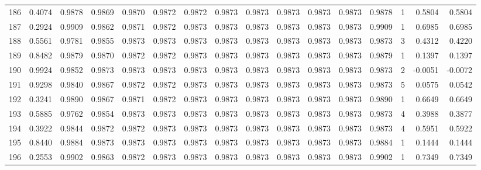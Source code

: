 \begin{tabular}{lrrrrrrrrrrrrrrr}
186 &      0.4074 &  0.9878 &  0.9869 &  0.9870 &  0.9872 &  0.9872 &  0.9873 &  0.9873 &  0.9873 &  0.9873 &   0.9873 &     0.9878 &      1 &                    0.5804 &                     0.5804 \\
187 &      0.2924 &  0.9909 &  0.9862 &  0.9871 &  0.9872 &  0.9873 &  0.9873 &  0.9873 &  0.9873 &  0.9873 &   0.9873 &     0.9909 &      1 &                    0.6985 &                     0.6985 \\
188 &      0.5561 &  0.9781 &  0.9855 &  0.9873 &  0.9873 &  0.9873 &  0.9873 &  0.9873 &  0.9873 &  0.9873 &   0.9873 &     0.9873 &      3 &                    0.4312 &                     0.4220 \\
189 &      0.8482 &  0.9879 &  0.9870 &  0.9872 &  0.9872 &  0.9873 &  0.9873 &  0.9873 &  0.9873 &  0.9873 &   0.9873 &     0.9879 &      1 &                    0.1397 &                     0.1397 \\
190 &      0.9924 &  0.9852 &  0.9873 &  0.9873 &  0.9873 &  0.9873 &  0.9873 &  0.9873 &  0.9873 &  0.9873 &   0.9873 &     0.9873 &      2 &                   -0.0051 &                    -0.0072 \\
191 &      0.9298 &  0.9840 &  0.9867 &  0.9872 &  0.9872 &  0.9873 &  0.9873 &  0.9873 &  0.9873 &  0.9873 &   0.9873 &     0.9873 &      5 &                    0.0575 &                     0.0542 \\
192 &      0.3241 &  0.9890 &  0.9867 &  0.9871 &  0.9872 &  0.9873 &  0.9873 &  0.9873 &  0.9873 &  0.9873 &   0.9873 &     0.9890 &      1 &                    0.6649 &                     0.6649 \\
193 &      0.5885 &  0.9762 &  0.9854 &  0.9873 &  0.9873 &  0.9873 &  0.9873 &  0.9873 &  0.9873 &  0.9873 &   0.9873 &     0.9873 &      4 &                    0.3988 &                     0.3877 \\
194 &      0.3922 &  0.9844 &  0.9872 &  0.9872 &  0.9873 &  0.9873 &  0.9873 &  0.9873 &  0.9873 &  0.9873 &   0.9873 &     0.9873 &      4 &                    0.5951 &                     0.5922 \\
195 &      0.8440 &  0.9884 &  0.9873 &  0.9873 &  0.9873 &  0.9873 &  0.9873 &  0.9873 &  0.9873 &  0.9873 &   0.9873 &     0.9884 &      1 &                    0.1444 &                     0.1444 \\
196 &      0.2553 &  0.9902 &  0.9863 &  0.9872 &  0.9873 &  0.9873 &  0.9873 &  0.9873 &  0.9873 &  0.9873 &   0.9873 &     0.9902 &      1 &                    0.7349 &                     0.7349 \\

\end{tabular}
